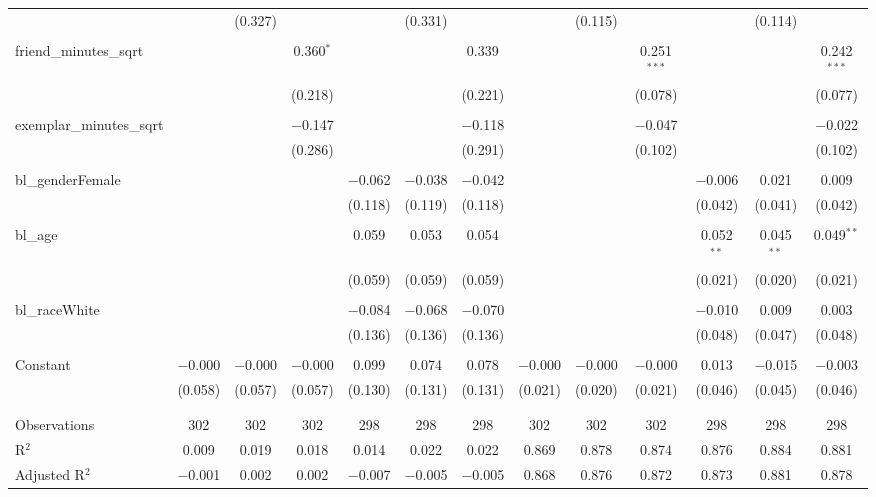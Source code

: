 \begin{table}[!htbp]
\begin{tabular}{@{\extracolsep{5pt}}lcccccccccccc}
  &  & (0.327) &  &  & (0.331) &  &  & (0.115) &  &  & (0.114) &  \\ 
  & & & & & & & & & & & & \\ 
 friend\_minutes\_sqrt &  &  & 0.360$^{*}$ &  &  & 0.339 &  &  & 0.251$^{***}$ &  &  & 0.242$^{***}$ \\ 
  &  &  & (0.218) &  &  & (0.221) &  &  & (0.078) &  &  & (0.077) \\ 
  & & & & & & & & & & & & \\ 
 exemplar\_minutes\_sqrt &  &  & $-$0.147 &  &  & $-$0.118 &  &  & $-$0.047 &  &  & $-$0.022 \\ 
  &  &  & (0.286) &  &  & (0.291) &  &  & (0.102) &  &  & (0.102) \\ 
  & & & & & & & & & & & & \\ 
 bl\_genderFemale &  &  &  & $-$0.062 & $-$0.038 & $-$0.042 &  &  &  & $-$0.006 & 0.021 & 0.009 \\ 
  &  &  &  & (0.118) & (0.119) & (0.118) &  &  &  & (0.042) & (0.041) & (0.042) \\ 
  & & & & & & & & & & & & \\ 
 bl\_age &  &  &  & 0.059 & 0.053 & 0.054 &  &  &  & 0.052$^{**}$ & 0.045$^{**}$ & 0.049$^{**}$ \\ 
  &  &  &  & (0.059) & (0.059) & (0.059) &  &  &  & (0.021) & (0.020) & (0.021) \\ 
  & & & & & & & & & & & & \\ 
 bl\_raceWhite &  &  &  & $-$0.084 & $-$0.068 & $-$0.070 &  &  &  & $-$0.010 & 0.009 & 0.003 \\ 
  &  &  &  & (0.136) & (0.136) & (0.136) &  &  &  & (0.048) & (0.047) & (0.048) \\ 
  & & & & & & & & & & & & \\ 
 Constant & $-$0.000 & $-$0.000 & $-$0.000 & 0.099 & 0.074 & 0.078 & $-$0.000 & $-$0.000 & $-$0.000 & 0.013 & $-$0.015 & $-$0.003 \\ 
  & (0.058) & (0.057) & (0.057) & (0.130) & (0.131) & (0.131) & (0.021) & (0.020) & (0.021) & (0.046) & (0.045) & (0.046) \\ 
  & & & & & & & & & & & & \\ 
\hline \\[-1.8ex] 
Observations & 302 & 302 & 302 & 298 & 298 & 298 & 302 & 302 & 302 & 298 & 298 & 298 \\ 
R$^{2}$ & 0.009 & 0.019 & 0.018 & 0.014 & 0.022 & 0.022 & 0.869 & 0.878 & 0.874 & 0.876 & 0.884 & 0.881 \\ 
Adjusted R$^{2}$ & $-$0.001 & 0.002 & 0.002 & $-$0.007 & $-$0.005 & $-$0.005 & 0.868 & 0.876 & 0.872 & 0.873 & 0.881 & 0.878 \\ 

\end{tabular}
\end{table}

